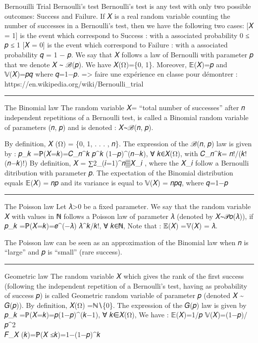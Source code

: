 \documentclass[
  letterpaper,
  DIV=11,
  numbers=noendperiod]{scrreprt}
\begin{document}
Bernouilli Trial Bernoulli's test Bernoulli's test is any test with only
two possible outcomes: Success and Failure. If 𝑋 is a real random
variable counting the number of successes in a Bernoulli's test, then we
have the following two cases: {[}𝑋 = 1{]} is the event which correspond
to Success : with a associated probability 0 ≤ 𝑝 ≤ 1 {[}𝑋 = 0{]} is the
event which correspond to Failure : with a associated probability 𝑞 = 1
− 𝑝. We say that 𝑋 follows a law of Bernoulli with parameter 𝑝 that we
denote 𝑋 ∼ ℬ(𝑝). We have 𝑋(Ω)=\{0, 1\}. Moreover, 𝔼(𝑋)=𝑝 and 𝕍(𝑋)=𝑝𝑞
where 𝑞=1−𝑝. =\textgreater{} faire une expérience en classe pour
démontrer : https://en.wikipedia.org/wiki/Bernoulli\_trial

\begin{center}\rule{0.5\linewidth}{0.5pt}\end{center}

The Binomial law The random variable 𝑋= ``total number of successes''
after 𝑛 independent repetitions of a Bernoulli test, is called a
Binomial random variable of parameters (𝑛, 𝑝) and is denoted : 𝑋∼ℬ(𝑛,
𝑝).

By definition, 𝑋 (Ω) = \{0, 1, . . . , 𝑛\}. The expression of the ℬ(𝑛,
𝑝) law is given by : 𝑝\_𝑘 =ℙ(𝑋=𝑘)=𝐶\_𝑛\^{}𝑘 𝑝\^{}𝑘 (1−𝑝)\^{}(𝑛−𝑘), ∀
𝑘∈𝑋(Ω), with 𝐶\_𝑛\^{}𝑘= 𝑛!/(𝑘!(𝑛−𝑘)!) By definition, 𝑋 =
∑2\_(𝑖=1)\^{}𝑛▒𝑋\_𝑖 , where the 𝑋\_𝑖 follow a Bernoulli ditribution with
parameter 𝑝. The expectation of the Binomial distribution equals 𝔼(𝑋) =
𝑛𝑝 and its variance is equal to 𝕍(𝑋) = 𝑛𝑝𝑞, where 𝑞=1−𝑝

\begin{center}\rule{0.5\linewidth}{0.5pt}\end{center}

The Poisson law Let 𝜆\textgreater0 be a fixed parameter. We say that the
random variable 𝑋 with values in ℕ follows a Poisson law of parameter 𝜆
(denoted by 𝑋∼𝒫𝑜(𝜆)), if 𝑝\_𝑘 =ℙ(𝑋=𝑘)=𝑒\^{}(−𝜆) 𝜆\^{}𝑘/𝑘!, ∀ 𝑘∈ℕ, Note
that : 𝔼(𝑋) =𝕍(𝑋) = 𝜆.

The Poisson law can be seen as an approximation of the Binomial law when
𝑛 is ``large'' and 𝑝 is ``small'' (rare success).

\begin{center}\rule{0.5\linewidth}{0.5pt}\end{center}

Geometric law The random variable 𝑋 which gives the rank of the first
success (following the independent repetition of a Bernoulli's test,
having as probability of success 𝑝) is called Geometric random variable
of parameter 𝑝 (denoted 𝑋 \textasciitilde{} 𝐺(𝑝)). By definition, 𝑋(Ω)
=ℕ∖\{0\}. The expression of the 𝐺(𝑝) law is given by 𝑝\_𝑘
=ℙ(𝑋=𝑘)=𝑝(1−𝑝)\^{}(𝑘−1), ∀ 𝑘∈𝑋(Ω), We have : 𝔼(𝑋)=1/𝑝
𝕍(𝑋)=(1−𝑝)/𝑝\^{}2\\
𝐹\_𝑋 (𝑘)=ℙ(𝑋 ≤𝑘)=1−(1−𝑝)\^{}𝑘
\end{document}
